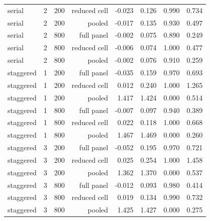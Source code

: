 {\begin{longtable}{llrrrrrr}
serial & 2 & 200 & reduced cell & -0.023 & 0.126 & 0.990 & 0.734 \\
serial & 2 & 200 & pooled & -0.017 & 0.135 & 0.930 & 0.497 \\
serial & 2 & 800 & full panel & -0.002 & 0.075 & 0.890 & 0.249 \\
serial & 2 & 800 & reduced cell & -0.006 & 0.074 & 1.000 & 0.477 \\
serial & 2 & 800 & pooled & -0.002 & 0.076 & 0.910 & 0.259 \\
staggered & 1 & 200 & full panel & -0.035 & 0.159 & 0.970 & 0.693 \\
staggered & 1 & 200 & reduced cell & 0.012 & 0.240 & 1.000 & 1.265 \\
staggered & 1 & 200 & pooled & 1.417 & 1.424 & 0.000 & 0.514 \\
staggered & 1 & 800 & full panel & -0.007 & 0.097 & 0.940 & 0.389 \\
staggered & 1 & 800 & reduced cell & 0.022 & 0.118 & 1.000 & 0.668 \\
staggered & 1 & 800 & pooled & 1.467 & 1.469 & 0.000 & 0.260 \\
staggered & 3 & 200 & full panel & -0.052 & 0.195 & 0.970 & 0.721 \\
staggered & 3 & 200 & reduced cell & 0.025 & 0.254 & 1.000 & 1.458 \\
staggered & 3 & 200 & pooled & 1.362 & 1.370 & 0.000 & 0.537 \\
staggered & 3 & 800 & full panel & -0.012 & 0.093 & 0.980 & 0.414 \\
staggered & 3 & 800 & reduced cell & 0.019 & 0.134 & 0.990 & 0.732 \\
staggered & 3 & 800 & pooled & 1.425 & 1.427 & 0.000 & 0.275 \\
\end{longtable}
}
